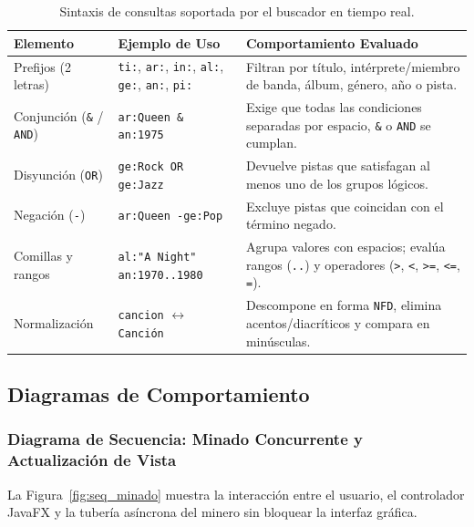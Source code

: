 \documentclass[12pt,a4paper]{article}
\begin{document}
\begin{table}[htbp]
\centering
\footnotesize
\renewcommand{\arraystretch}{0.92}
\begin{tabularx}{\textwidth}{l p{4.2cm} X}
\toprule
\textbf{Elemento} & \textbf{Ejemplo de Uso} & \textbf{Comportamiento Evaluado} \\
\midrule
Prefijos (2 letras) & \texttt{ti:}, \texttt{ar:}, \texttt{in:}, \texttt{al:}, \texttt{ge:}, \texttt{an:}, \texttt{pi:} & Filtran por título, intérprete/miembro de banda, álbum, género, año o pista. \\
Conjunción (\texttt{\&} / \texttt{AND}) & \texttt{ar:Queen \& an:1975} & Exige que todas las condiciones separadas por espacio, \texttt{\&} o \texttt{AND} se cumplan. \\
Disyunción (\texttt{OR}) & \texttt{ge:Rock OR ge:Jazz} & Devuelve pistas que satisfagan al menos uno de los grupos lógicos. \\
Negación (\texttt{-}) & \texttt{ar:Queen -ge:Pop} & Excluye pistas que coincidan con el término negado. \\
Comillas y rangos & \texttt{al:"A Night"} \texttt{an:1970..1980} & Agrupa valores con espacios; evalúa rangos (\texttt{..}) y operadores (\texttt{>}, \texttt{<}, \texttt{>=}, \texttt{<=}, \texttt{=}). \\
Normalización & \texttt{cancion} $\leftrightarrow$ \texttt{Canción} & Descompone en forma \texttt{NFD}, elimina acentos/diacríticos y compara en minúsculas. \\
\bottomrule
\end{tabularx}
\caption{Sintaxis de consultas soportada por el buscador en tiempo real.}
\label{tab:buscador}
\end{table}

\subsection{Diagramas de Comportamiento}

\subsubsection{Diagrama de Secuencia: Minado Concurrente y Actualización de Vista}
La Figura~\ref{fig:seq_minado} muestra la interacción entre el usuario, el controlador JavaFX y la tubería asíncrona del minero sin bloquear la interfaz gráfica.
\end{document}
